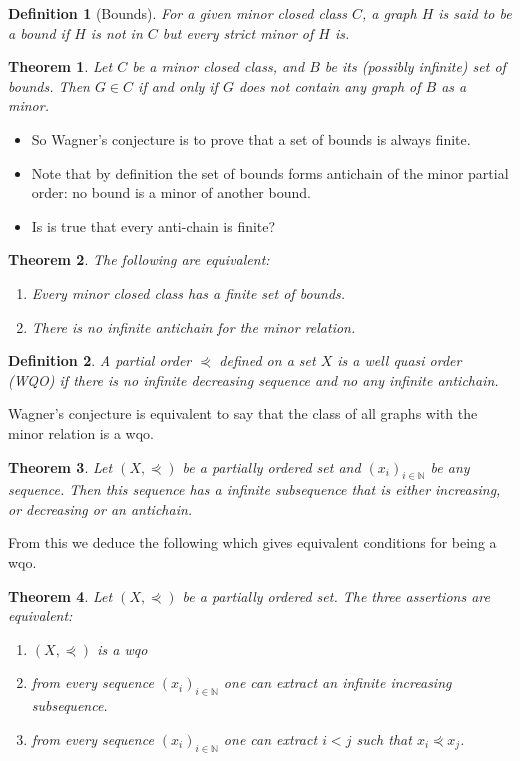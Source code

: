 \documentclass[12pt,a4paper]{article}
\def\N{\mathbb{N}}
\newtheorem{theorem}{Theorem}
\newtheorem{definition}{Definition}
\begin{document}
\begin{definition}[Bounds]
  For a given minor closed class $C$, a graph $H$ is said to be a bound if $H$
  is not in $C$ but every strict minor of $H$ is.
\end{definition}

\begin{theorem}
  Let $C$ be a minor closed class, and $B$ be its (possibly infinite) set of
  bounds. Then $G \in C$ if and only if $G$ does not contain any graph of $B$ as
  a minor.
\end{theorem}

\begin{itemize}
\item So Wagner's conjecture is to prove that a set of bounds is always finite.
\item Note that by definition the set of bounds forms antichain of the minor
  partial order: no bound is a minor of another bound.
\item Is is true that every anti-chain is finite?
\end{itemize}

\begin{theorem}
  The following are equivalent:
  \begin{enumerate}
  \item Every minor closed class has a finite set of bounds.
  \item There is no infinite antichain for the minor relation.
  \end{enumerate}
\end{theorem}

\begin{definition}
  A partial order $\curlyeqprec$ defined on a set $X$ is a well quasi order
  (WQO) if there is no infinite decreasing sequence and no any infinite
  antichain.
\end{definition}

Wagner's conjecture is equivalent to say that the class of all graphs with the
minor relation is a wqo.

\begin{theorem}
  Let $(X, \curlyeqprec)$ be a partially ordered set and $( x_i )_{i \in \N}$ be
  any sequence. Then this sequence has a infinite subsequence that is either
  increasing, or decreasing or an antichain.
\end{theorem}

From this we deduce the following which gives equivalent conditions for being a
wqo.

\begin{theorem}
  Let $(X, \curlyeqprec)$ be a partially ordered set. The three assertions are
  equivalent:
\begin{enumerate}
\item $(X, \curlyeqprec)$ is a wqo
\item from every sequence $( x_i )_{i \in \N}$ one can extract an infinite
  increasing subsequence.
\item from every sequence $( x_i )_{i \in \N}$ one can extract $i < j$ such that
  $x_i \curlyeqprec x_j$.
\end{enumerate}
\end{theorem}
\end{document}
